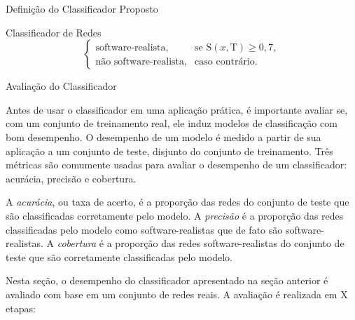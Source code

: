 \begin{section}{Definição do Classificador Proposto}
\begin{subsection}{Classificador de Redes}
$$
\left\{
\begin{array}{cl}
\mbox{software-realista,} & \mbox{se } \mathrm{S}(x, \mbox{T}) \ge 0,7, \\
\mbox{não software-realista,} & \mbox{caso contrário.}
\end{array}
\right.
$$



\end{subsection}
\end{section}

\begin{section}{Avaliação do Classificador} \label{cap:clas3}

	Antes de usar o classificador em uma aplicação prática, é importante avaliar se, com um conjunto de treinamento real, ele induz modelos de classificação com bom desempenho. O desempenho de um modelo é medido a partir de sua aplicação a um conjunto de teste, disjunto do conjunto de treinamento. Três métricas são comumente usadas para avaliar o desempenho de um classificador: acurácia, precisão e cobertura.

	A \emph{acurácia}, ou taxa de acerto, é a proporção das redes do conjunto de teste que são classificadas corretamente pelo modelo. A \emph{precisão} é a proporção das redes classificadas pelo modelo como software-realistas que de fato são software-realistas. A \emph{cobertura} é a proporção das redes software-realistas do conjunto de teste que são corretamente classificadas pelo modelo.
	
	Nesta seção, o desempenho do classificador apresentado na seção anterior é avaliado com base em um conjunto de redes reais. A avaliação é realizada em X etapas: 
	

\end{section}
